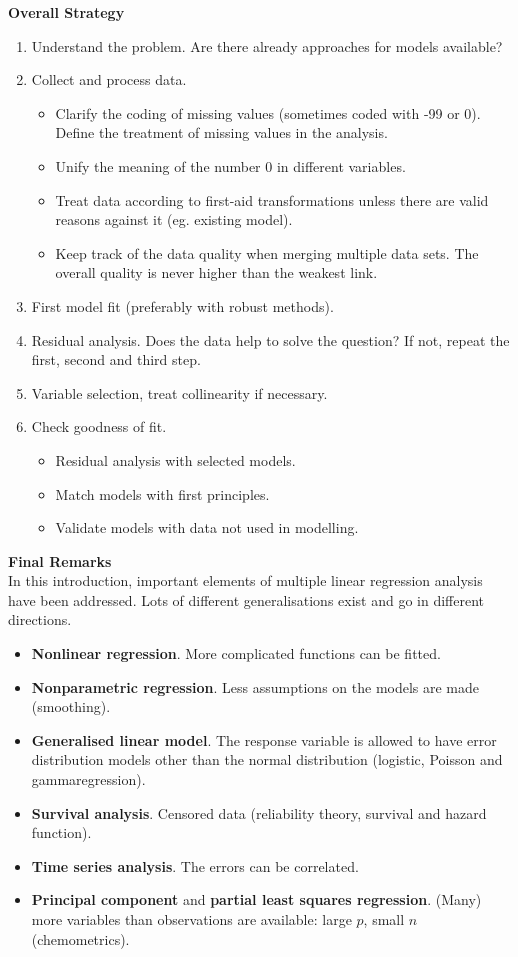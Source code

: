 \textbf{Overall Strategy}\\
\begin{enumerate}
  \item Understand the problem. Are there already approaches for models available?
  \item Collect and process data.
  \begin{itemize}
    \item Clarify the coding of missing values (sometimes coded with -99 or 0). Define the treatment of missing values in the analysis.
    \item Unify the meaning of the number 0 in different variables.
    \item Treat data according to first-aid transformations unless there are valid reasons against it (eg. existing model).
    \item Keep track of the data quality when merging multiple data sets. The overall quality is never higher than the weakest link.
  \end{itemize}
  \item First model fit (preferably with robust methods).
  \item Residual analysis. Does the data help to solve the question? If not, repeat the first,
  second and third step.
  \item Variable selection, treat collinearity if necessary.
  \item Check goodness of fit.
  \begin{itemize}
    \item Residual analysis with selected models.
    \item Match models with first principles.
    \item Validate models with data not used in modelling.
  \end{itemize}
\end{enumerate}

\textbf{Final Remarks}\\
In this introduction, important elements of multiple linear regression analysis have been addressed. Lots of different generalisations exist and go in different directions.
\begin{itemize}
  \item \textbf{Nonlinear regression}. More complicated functions can be fitted.
  \item \textbf{Nonparametric regression}. Less assumptions on the models are made (smoothing).
  \item \textbf{Generalised linear model}. The response variable is allowed to have error distribution models other than the normal distribution (logistic, Poisson and gammaregression).
  \item \textbf{Survival analysis}. Censored data (reliability theory, survival and hazard function).
  \item \textbf{Time series analysis}. The errors can be correlated.
  \item \textbf{Principal component} and \textbf{partial least squares regression}. (Many) more variables than observations are available: large $p$, small $n$ (chemometrics).
\end{itemize}
